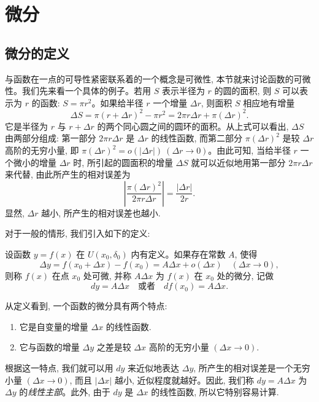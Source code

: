 \section{微分}
\label{sec:ma-4-3}

\subsection{微分的定义}
\label{subsec:ma-4-3-1}

与函数在一点的可导性紧密联系着的一个概念是可微性, 本节就来讨论函数的可微性。我们先来看一个具体的例子。若用 $S$ 表示半径为 $r$ 的圆的面积, 则 $S$ 可以表示为 $r$ 的函数: $S=\pi r^2$。如果给半径 $r$ 一个增量 $\Delta r$, 则面积 $S$ 相应地有增量
\[
  \Delta S
  =
  \pi(r+\Delta r)^2-\pi r^2
  =
  2\pi r\Delta r+\pi(\Delta r)^2.
\]
它是半径为 $r$ 与 $r+\Delta r$ 的两个同心圆之间的圆环的面积。从上式可以看出, $\Delta S$ 由两部分组成: 第一部分 $2\pi r\Delta r$ 是 $\Delta r$ 的线性函数, 而第二部分 $\pi(\Delta r)^2$ 是较 $\Delta r$ 高阶的无穷小量, 即 $\pi(\Delta r)^2=o(|\Delta r|)\ (\Delta r\to0)$。由此可知, 当给半径 $r$ 一个微小的增量 $\Delta r$ 时, 所引起的圆面积的增量 $\Delta S$ 就可以近似地用第一部分 $2\pi r\Delta r$ 来代替, 由此所产生的相对误差为
\[
  \left|\frac{\pi(\Delta r)^2}{2\pi r\Delta r}\right|
  =
  \frac{|\Delta r|}{2r}.
\]
显然, $\Delta r$ 越小, 所产生的相对误差也越小.

对于一般的情形, 我们引入如下的定义:

\begin{definition}\label{definition:ma-4-3-1}
设函数 $y=f(x)$ 在 $U(x_0,\delta_0)$ 内有定义。如果存在常数 $A$, 使得
\[
  \Delta y=f(x_0+\Delta x)-f(x_0)=A\Delta x+o(\Delta x)
  \quad(\Delta x\to0),
\]
则称 $f(x)$ 在点 $x_0$ 处可微, 并称 $A\Delta x$ 为 $f(x)$ 在 $x_0$ 处的微分, 记做
\[
  dy=A\Delta x\quad\text{或者}\quad df(x_0)=A\Delta x.
\]
\end{definition}

从定义看到, 一个函数的微分具有两个特点:
\begin{enumerate}
  \item 它是自变量的增量 $\Delta x$ 的线性函数.
  \item 它与函数的增量 $\Delta y$ 之差是较 $\Delta x$ 高阶的无穷小量 $(\Delta x\to0)$.
\end{enumerate}
根据这一特点, 我们就可以用 $dy$ 来近似地表达 $\Delta y$, 所产生的相对误差是一个无穷小量 $(\Delta x\to0)$, 而且 $|\Delta x|$ 越小, 近似程度就越好。因此, 我们称 $dy=A\Delta x$ 为 $\Delta y$ 的\emph{线性主部}。此外, 由于 $dy$ 是 $\Delta x$ 的线性函数, 所以它特别容易计算.

